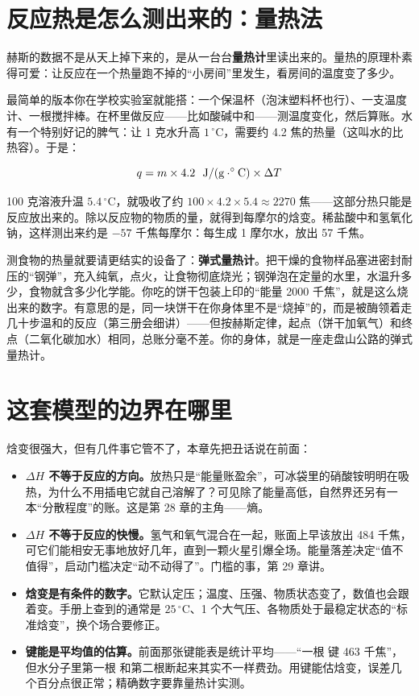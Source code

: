 \section{反应热是怎么测出来的：量热法}

赫斯的数据不是从天上掉下来的，是从一台台\textbf{量热计}里读出来的。量热的原理朴素得可爱：让反应在一个热量跑不掉的“小房间”里发生，看房间的温度变了多少。

最简单的版本你在学校实验室就能搭：一个保温杯（泡沫塑料杯也行）、一支温度计、一根搅拌棒。在杯里做反应——比如酸碱中和——测温度变化，然后算账。水有一个特别好记的脾气：让 1 克水升高 $1\,^{\circ}\mathrm{C}$，需要约 4.2 焦的热量（这叫水的比热容）。于是：

\[ q = m \times 4.2\ \ \mathrm{J/(g\cdot ^{\circ}C)} \times \Delta T \]

100 克溶液升温 $5.4\,^{\circ}\mathrm{C}$，就吸收了约 $100\times4.2\times5.4\approx2270$ 焦——这部分热只能是反应放出来的。除以反应物的物质的量，就得到每摩尔的焓变。稀盐酸中和氢氧化钠，这样测出来约是 $-57$ 千焦每摩尔：每生成 1 摩尔水，放出 57 千焦。

测食物的热量就要请更结实的设备了：\textbf{弹式量热计}。把干燥的食物样品塞进密封耐压的“钢弹”，充入纯氧，点火，让食物彻底烧光；钢弹泡在定量的水里，水温升多少，食物就含多少化学能。你吃的饼干包装上印的“能量 2000 千焦”，就是这么烧出来的数字。有意思的是，同一块饼干在你身体里不是“烧掉”的，而是被酶领着走几十步温和的反应（第三册会细讲）——但按赫斯定律，起点（饼干加氧气）和终点（二氧化碳加水）相同，总账分毫不差。你的身体，就是一座走盘山公路的弹式量热计。

\section{这套模型的边界在哪里}

焓变很强大，但有几件事它管不了，本章先把丑话说在前面：

\begin{itemize}[itemsep=2pt]
\item \textbf{$\Delta H$ 不等于反应的方向。}放热只是“能量账盈余”，可冰袋里的硝酸铵明明在吸热，为什么不用插电它就自己溶解了？可见除了能量高低，自然界还另有一本“分散程度”的账。这是第 28 章的主角——熵。
\item \textbf{$\Delta H$ 不等于反应的快慢。}氢气和氧气混合在一起，账面上早该放出 484 千焦，可它们能相安无事地放好几年，直到一颗火星引爆全场。能量落差决定“值不值得”，启动门槛决定“动不动得了”。门槛的事，第 29 章讲。
\item \textbf{焓变是有条件的数字。}它默认定压；温度、压强、物质状态变了，数值也会跟着变。手册上查到的通常是 $25\,^{\circ}\mathrm{C}$、1 个大气压、各物质处于最稳定状态的“标准焓变”，换个场合要修正。
\item \textbf{键能是平均值的估算。}前面那张键能表是统计平均——“一根  键 463 千焦”，但水分子里第一根  和第二根断起来其实不一样费劲。用键能估焓变，误差几个百分点很正常；精确数字要靠量热计实测。
\end{itemize}

